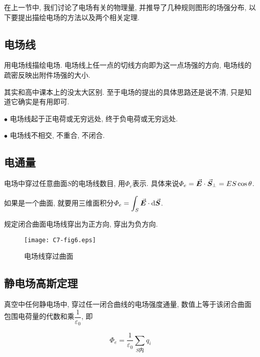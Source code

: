 在上一节中, 我们讨论了电场有关的物理量, 并推导了几种规则图形的场强分布, 以下要提出描绘电场的方法以及两个相关定理. 

\subsection{电场线}

用电场线描绘电场. 电场线上任一点的切线方向即为这一点场强的方向, 电场线的疏密反映出附件场强的大小. 

其实和高中课本上的没太大区别. 至于电场的提出的具体思路还是说不清, 只是知道它确实是有用即可. 

\begin{note}
	
	$\bullet$ 电场线起于正电荷或无穷远处, 终于负电荷或无穷远处. 
	
	$\bullet$ 电场线不相交, 不重合, 不闭合. 
	
\end{note}

\subsection{电通量}

电场中穿过任意曲面$S$的电场线数目, 用$\varPhi_e$表示. 具体来说$\varPhi_e = \va*{E} \cdot \va*{S}_{\bot} = E S \cos \theta$. 

\vskip 0.3cm

如果是一个曲面, 就要用三维面积分$\displaystyle \varPhi_e = \int_{S} {\va*{E} \cdot \dd{\va*{S}}}$. 

\vskip 0.3cm

规定闭合曲面电场线穿出为正方向, 穿出为负方向. 

\begin{figure}[h]
	\centering
	\texttt{[image: C7-fig6.eps]}
	\caption{电场线穿过曲面}
\end{figure}

\subsection{静电场高斯定理}

\begin{theorem}[静电场高斯定理]\label{C7-thgs}
	真空中任何静电场中, 穿过任一闭合曲线的电场强度通量, 数值上等于该闭合曲面包围电荷量的代数和乘$\dfrac{1}{\varepsilon_0}$, 即
	
	\begin{equation}
		\varPhi_e = \dfrac{1}{\varepsilon_0} \sum\limits_{S\text{内}} q_i \label{C7-eq4}
	\end{equation}
	
\end{theorem}

